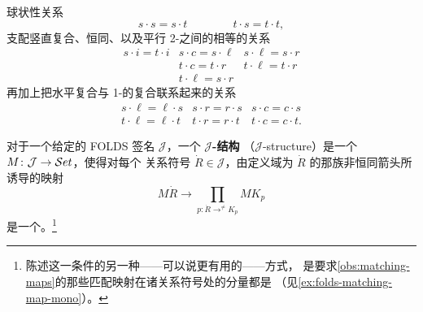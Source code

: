 \begin{example}
\begin{equation*}
\end{equation*}
球状性关系
\begin{equation*}
s\cdot s = s\cdot t\qquad\qquad t\cdot s = t\cdot t,
\end{equation*}
支配竖直复合、恒同、以及平行 2-\trCell{}之间的相等的关系
\begin{equation*}
\begin{array}{ccc}
s\cdot i = t\cdot i & s\cdot c = s\cdot \ell & s\cdot \ell = s\cdot r\\
 & t\cdot c = t\cdot r & t\cdot \ell = t\cdot r\\
 & t\cdot \ell = s\cdot r &
\end{array}
\end{equation*}
再加上把水平复合与 1-\trCell{}的复合联系起来的关系
\begin{equation*}
\begin{array}{ccc}
s\cdot \ell = \ell\cdot s & s\cdot r = r\cdot s & s\cdot c = c\cdot s\\
t\cdot \ell = \ell\cdot t & t\cdot r = r\cdot t & t\cdot c = c\cdot t.
\end{array}
\end{equation*}
\end{example}

\begin{definition}\label{def:j-structure}
对于一个给定的 FOLDS 签名 $\mathcal{J}$，一个 \textbf{$\mathcal{J}$-结构}
（$\mathcal{J}$-structure）是一个\trFunctor{} $M\colon\mathcal{J}\to\mathcal{S}et$，使得对每个
关系符号 $\dot{R}\in\mathcal{J}$，由定义域为 $\dot{R}$ 的那族非恒同箭头所诱导的映射
\begin{equation*}
M\dot{R}\longrightarrow\prod_{p\colon \dot{R}\to^{\neq}K_{p}} MK_{p}
\end{equation*}
是一个\trMonomorphism。\footnote{陈述这一条件的另一种——可以说更有用的——方式，
是要求\cref{obs:matching-maps}的那些匹配映射在诸关系符号处的分量都是%
\trMonomorphism{}（见\cref{ex:folds-matching-map-mono}）。}
\end{definition}

